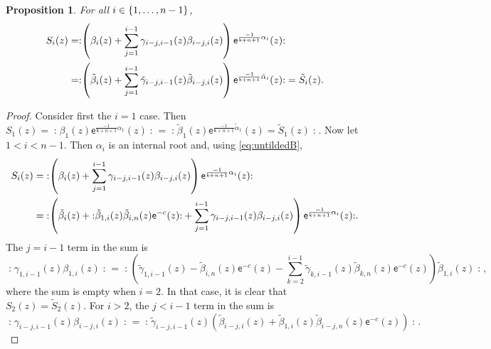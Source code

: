 \documentclass[10pt,a4paper]{amsart}
\numberwithin{equation}{section}
\newcommand{\ee}{\mathsf{e}}   %
\newcommand{\kk}{\mathsf{k}}   %
\DeclarePairedDelimiter{\set}{\lbrace}{\rbrace}
\newcommand{\no}[1]{\mathopen{:} #1 \mathclose{:}} %
\newcommand{\sroot}[1]{\alpha_{#1}}                                  %
\theoremstyle{plain}
\newtheorem{proposition}[theorem]{Proposition}
\begin{document}
\begin{proposition}
    For all $i \in \set{1,\dots,n-1}$, 
    \begin{align}
        S_i(z) =& \no{\left( \beta_i(z) + \sum_{j=1}^{i-1} \gamma_{i-j,i-1}(z) \beta_{i-j,i}(z)  \right) \ee^{\frac{-1}{\kk+n+1} \alpha_i}(z) } \\
        =& \no{\left( \tilde{\beta}_i(z) + \sum_{j=1}^{i-1} \tilde{\gamma}_{i-j,i-1}(z) \tilde{\beta}_{i-j,i}(z)  \right) \ee^{\frac{-1}{\kk+n+1} \tilde{\alpha}_i}(z) } = \tilde{S}_i(z). \notag
    \end{align}
\end{proposition}
\begin{proof}
    Consider first the $i=1$ case. Then $S_1(z)=\no{\beta_1(z)\ee^{\frac{-1}{\kk+n+1} \alpha_1}(z) } = \no{\tilde{\beta}_1(z)\ee^{\frac{-1}{\kk+n+1} \tilde{\alpha}_1}(z) = \tilde{S}_1(z)}$.
    Now let $1<i<n-1$. Then $\sroot{i}$ is an internal root and, using \eqref{eq:untildedB},
    \begin{align}
        S_i(z) &= \no{\left( \beta_i(z) + \sum_{j=1}^{i-1} \gamma_{i-j,i-1}(z) \beta_{i-j,i}(z)  \right) \ee^{\frac{-1}{\kk+n+1} \alpha_i}(z) } \\
        &= \no{\left( \tilde{\beta}_i(z)+\no{\tilde{\beta}_{1,i} (z) \tilde{\beta}_{i,n}(z)\ee^{-c}(z)} + \sum_{j=1}^{i-1} \gamma_{i-j,i-1}(z) \beta_{i-j,i}(z)  \right) \ee^{\frac{-1}{\kk+n+1} \alpha_i}(z) }. \notag
    \end{align}
    The $j=i-1$ term in the sum is
    \begin{equation}
        \no{\gamma_{1,i-1}(z) \beta_{1,i}(z)} = \no{\left(\tilde{\gamma}_{1,i-1}(z)-\tilde{\beta}_{i,n}(z)\ee^{-c}(z)
        - \sum_{k=2}^{i-1} \tilde{\gamma}_{k,i-1}(z)\tilde{\beta}_{k,n}(z)\ee^{-c}(z)\right) \tilde{\beta}_{1,i}(z)},
    \end{equation}
    where the sum is empty when $i=2$. In that case, it is clear that $S_2(z)=\tilde{S}_2(z)$. For $i>2$, the $j<i-1$ term in the sum is
    \begin{equation}
        \no{\gamma_{i-j,i-1}(z) \beta_{i-j,i}(z)} = \no{\tilde{\gamma}_{i-j,i-1}(z) \left( \tilde{\beta}_{i-j,i}(z)+ \tilde{\beta}_{1,i} (z) \tilde{\beta}_{i-j,n}(z)\ee^{-c}(z)\right)}.
    \end{equation}
    

\end{proof}
\end{document}
